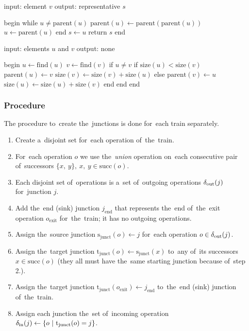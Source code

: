 \begin{algorithm}[float, caption={Disjoint set - find}, label={alg:disjset_find}]
input: element $v$
output: representative $s$

begin
  while $u \neq \mathrm{parent}(u)$
    $\mathrm{parent}(u) \gets \mathrm{parent}(\mathrm{parent}(u))$
    $u \gets \mathrm{parent}(u)$
  end
  $s \gets u$
  return $s$
end
\end{algorithm}


\begin{algorithm}[float, caption={Disjoint set - union}, label={alg:disjset_union}]
input: elements $u$ and $v$
output: none

begin
  $u \gets \mathrm{find}(u)$
  $v \gets \mathrm{find}(v)$
  if $u \neq v$
    if $\mathrm{size}(u) < \mathrm{size}(v)$
      $\mathrm{parent}(u) \gets v$
      $\mathrm{size}(v) \gets \mathrm{size}(v) + \mathrm{size}(u)$
    else
      $\mathrm{parent}(v) \gets u$
      $\mathrm{size}(u) \gets \mathrm{size}(u) + \mathrm{size}(v)$
    end
  end
end
\end{algorithm}

\FloatBarrier

\subsubsection{Procedure}
The procedure to~create the~junctions is done for~each train separately.
\begin{enumerate}
  \item Create a~disjoint set for~each operation of~the~train.
  \item For~each operation $o$ we use the~\emph{union} operation on~each consecutive pair of~successors $\{x,\ y\},\ x,\ y \in \mathrm{succ}(o)$.
  \item Each disjoint set of~operations is a~set of~outgoing operations $\operatorname{\delta_{out}}(j)$ for~junction $j$.
  \item Add the~end (sink) junction $j_{\mathrm{end}}$ that represents the~end of~the~exit operation $o_{\mathrm{exit}}$ for~the~train; it has no outgoing operations.
  \item Assign the~source junction $\mathrm{s}_{\mathrm{junct}}(o) \gets j$ for~each operation $o \in \operatorname{\delta_{out}}(j)$.
  \item Assign the~target junction $\mathrm{t}_{\mathrm{junct}}(o) \gets \mathrm{s}_{\mathrm{junct}}(x)$ to~any of~its successors $x \in \mathrm{succ}(o)$ (they all must have the~same starting junction because of~step 2.).
  \item Assign the~target junction $\mathrm{t}_{\mathrm{junct}}(o_{\mathrm{exit}}) \gets j_{\mathrm{end}}$ to~the~end (sink) junction of~the~train.
  \item Assign each junction the~set of~incoming operation $\inedges(j) \gets \{o\ |\ \mathrm{t}_{\mathrm{junct}}(o)=j\}$.
\end{enumerate}

